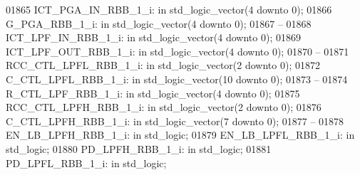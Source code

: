 \begin{DoxyCode}
01865     ICT\_PGA\_IN\_RBB\_1\_i: \textcolor{keywordflow}{in} \textcolor{comment}{std\_logic\_vector}(\textcolor{vhdllogic}{}\textcolor{vhdllogic}{4} \textcolor{keywordflow}{downto} \textcolor{vhdllogic}{}\textcolor{vhdllogic}{0});
01866     G\_PGA\_RBB\_1\_i:  \textcolor{keywordflow}{in} \textcolor{comment}{std\_logic\_vector}(\textcolor{vhdllogic}{}\textcolor{vhdllogic}{4} \textcolor{keywordflow}{downto} \textcolor{vhdllogic}{}\textcolor{vhdllogic}{0});
01867 \textcolor{keyword}{    --}
01868     ICT\_LPF\_IN\_RBB\_1\_i: \textcolor{keywordflow}{in} \textcolor{comment}{std\_logic\_vector}(\textcolor{vhdllogic}{}\textcolor{vhdllogic}{4} \textcolor{keywordflow}{downto} \textcolor{vhdllogic}{}\textcolor{vhdllogic}{0});
01869     ICT\_LPF\_OUT\_RBB\_1\_i:    \textcolor{keywordflow}{in} \textcolor{comment}{std\_logic\_vector}(\textcolor{vhdllogic}{}\textcolor{vhdllogic}{4} \textcolor{keywordflow}{downto} \textcolor{vhdllogic}{}\textcolor{vhdllogic}{0});
01870 \textcolor{keyword}{    --}
01871     RCC\_CTL\_LPFL\_RBB\_1\_i:   \textcolor{keywordflow}{in} \textcolor{comment}{std\_logic\_vector}(\textcolor{vhdllogic}{}\textcolor{vhdllogic}{2} \textcolor{keywordflow}{downto} \textcolor{vhdllogic}{}\textcolor{vhdllogic}{0});
01872     C\_CTL\_LPFL\_RBB\_1\_i: \textcolor{keywordflow}{in} \textcolor{comment}{std\_logic\_vector}(\textcolor{vhdllogic}{}\textcolor{vhdllogic}{10} \textcolor{keywordflow}{downto} \textcolor{vhdllogic}{}\textcolor{vhdllogic}{0});
01873 \textcolor{keyword}{    --}
01874     R\_CTL\_LPF\_RBB\_1\_i:  \textcolor{keywordflow}{in} \textcolor{comment}{std\_logic\_vector}(\textcolor{vhdllogic}{}\textcolor{vhdllogic}{4} \textcolor{keywordflow}{downto} \textcolor{vhdllogic}{}\textcolor{vhdllogic}{0});
01875     RCC\_CTL\_LPFH\_RBB\_1\_i:   \textcolor{keywordflow}{in} \textcolor{comment}{std\_logic\_vector}(\textcolor{vhdllogic}{}\textcolor{vhdllogic}{2} \textcolor{keywordflow}{downto} \textcolor{vhdllogic}{}\textcolor{vhdllogic}{0});
01876     C\_CTL\_LPFH\_RBB\_1\_i: \textcolor{keywordflow}{in} \textcolor{comment}{std\_logic\_vector}(\textcolor{vhdllogic}{}\textcolor{vhdllogic}{7} \textcolor{keywordflow}{downto} \textcolor{vhdllogic}{}\textcolor{vhdllogic}{0});
01877 \textcolor{keyword}{    --}
01878     EN\_LB\_LPFH\_RBB\_1\_i: \textcolor{keywordflow}{in} \textcolor{comment}{std\_logic};
01879     EN\_LB\_LPFL\_RBB\_1\_i: \textcolor{keywordflow}{in} \textcolor{comment}{std\_logic};
01880     PD\_LPFH\_RBB\_1\_i:    \textcolor{keywordflow}{in} \textcolor{comment}{std\_logic};
01881     PD\_LPFL\_RBB\_1\_i:    \textcolor{keywordflow}{in} \textcolor{comment}{std\_logic};

\end{DoxyCode}
